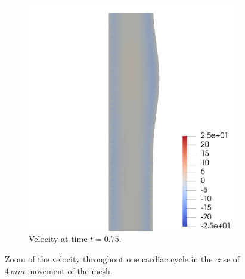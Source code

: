 \documentclass[a4paper,11pt,oneside]{book}
\begin{document}
\begin{figure}[h!]
\begin{subfigure}[b]{0.5\linewidth}
    \includegraphics[width=1.2\linewidth]{images/velocity_30_075.png} 
        \centering
    \caption{Velocity at time $t = 0.75$.} 
    \label{fig2:d} 
  \end{subfigure} 
  \centering
  \caption{Zoom of the velocity throughout one cardiac cycle in the case of $4 \, mm$ movement of the mesh.}
  \label{fig2} 
\end{figure}


\newpage
\end{document}
